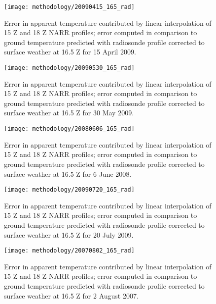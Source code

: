 \documentclass{book}
\begin{document}
\begin{figure}[H]
\centering
\texttt{[image: methodology/20090415\_165\_rad]}
\caption{Error in apparent temperature contributed by linear interpolation of 15 Z and 18 Z NARR profiles; error computed in comparison to ground temperature predicted with radiosonde profile corrected to surface weather at 16.5 Z for 15 April 2009.}
\label{fig:20090415_165_rad}
\end{figure}

\begin{figure}[H]
\centering
\texttt{[image: methodology/20090530\_165\_rad]}
\caption{Error in apparent temperature contributed by linear interpolation of 15 Z and 18 Z NARR profiles; error computed in comparison to ground temperature predicted with radiosonde profile corrected to surface weather at 16.5 Z for 30 May 2009.}
\label{fig:20090530_165_rad}
\end{figure}

\begin{figure}[H]
\centering
\texttt{[image: methodology/20080606\_165\_rad]}
\caption{Error in apparent temperature contributed by linear interpolation of 15 Z and 18 Z NARR profiles; error computed in comparison to ground temperature predicted with radiosonde profile corrected to surface weather at 16.5 Z for 6 June 2008.}
\label{fig:20080606_165_rad}
\end{figure}

\begin{figure}[H]
\centering
\texttt{[image: methodology/20090720\_165\_rad]}
\caption{Error in apparent temperature contributed by linear interpolation of 15 Z and 18 Z NARR profiles; error computed in comparison to ground temperature predicted with radiosonde profile corrected to surface weather at 16.5 Z for 20 July 2009.}
\label{fig:20090720_165_rad}
\end{figure}

\begin{figure}[H]
\centering
\texttt{[image: methodology/20070802\_165\_rad]}
\caption{Error in apparent temperature contributed by linear interpolation of 15 Z and 18 Z NARR profiles; error computed in comparison to ground temperature predicted with radiosonde profile corrected to surface weather at 16.5 Z for 2 August 2007.}
\label{fig:20090802_165_rad}
\end{figure}
\end{document}
